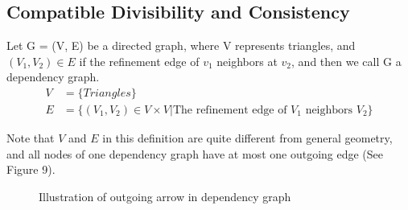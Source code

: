     \subsection{Compatible Divisibility and Consistency}
    \begin{definition*}
      Let G = (V, E) be a directed graph, where V represents triangles, and $(V_1, V_2)\in E$ if the refinement edge of $v_1$ neighbors at $v_2$, and then we call G a dependency graph.
      \begin{align*}
      V &= \{Triangles\}\\
      E &= \{(V_1, V_2)\in V\times V | \text{The refinement edge of $V_1$ neighbors $V_2$}\}
      \end{align*}
    \end{definition*}
    Note that $V$ and $E$ in this definition are quite different from general geometry, and all nodes of one dependency graph have at most one outgoing edge (See Figure 9).%
    \begin{figure}[h!]
    \centering
    \caption{Illustration of outgoing arrow in dependency graph}
    \label{Figure 9}
    \end{figure}


